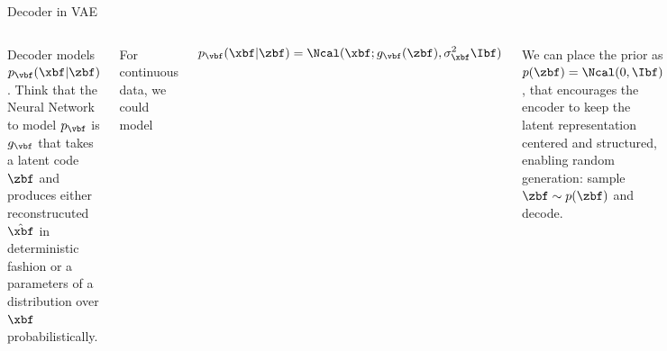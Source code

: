 \documentclass[aspectratio=169,xcolor=dvipsnames,svgnames,x11names,fleqn]{beamer}
\begin{document}
\begin{frame}{Decoder in VAE}

\footnotesize

\begin{columns}


Decoder models $p_\vbf(\xbf | \zbf)$. Think that the Neural Network to model $p_\vbf$ is $g_\vbf$ that takes a latent code $\zbf$ and produces either reconstrucuted $\hat{\xbf}$ in deterministic fashion or a parameters of a distribution over $\xbf$ probabilistically.

\vspace{10pt}

For continuous data, we could model 

\begin{reparambox}
\begin{align*}
p_\vbf(\xbf | \zbf) = \Ncal (\xbf; g_\vbf(\zbf), \sigma_\xbf^2\Ibf)
\end{align*}
\end{reparambox}

\vspace{10pt}

We can place the prior as $p(\zbf) = \Ncal(0, \Ibf)$,  that encourages the encoder to keep the latent representation centered and structured, enabling random generation: sample $\zbf \sim p(\zbf)$ and decode.


\resizebox{0.95\textwidth}{!}
{
      }
\end{columns}
\end{frame}
\end{document}
